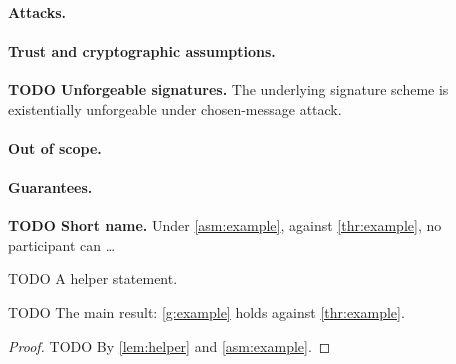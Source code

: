 \paragraph{Attacks.}

\paragraph{Trust and cryptographic assumptions.}
\begin{assumptions}
  \item\label{asm:example} \textbf{TODO Unforgeable signatures.} The underlying signature scheme is existentially unforgeable under chosen-message attack.
\end{assumptions}

\paragraph{Out of scope.}

\paragraph{Guarantees.}

\begin{guarantees}
  \item\label{g:example} \textbf{TODO Short name.} Under \cref{asm:example}, against \cref{thr:example}, no participant can \dots
\end{guarantees}

\begin{lemma}[TODO]\label{lem:helper}
TODO A helper statement.
\end{lemma}

\begin{theorem}[TODO]\label{thm:main}
TODO The main result: \cref{g:example} holds against \cref{thr:example}.
\end{theorem}

\begin{proof}
TODO By \cref{lem:helper} and \cref{asm:example}.
\end{proof}
